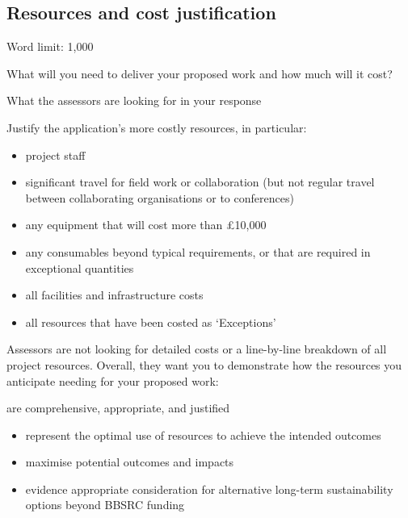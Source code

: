 \documentclass[12in]{article}
\begin{document}
\subsection{Resources and cost justification}

{\color{red}

Word limit: 1,000

What will you need to deliver your proposed work and how much will it cost?

What the assessors are looking for in your response

Justify the application’s more costly resources, in particular:

\begin{itemize}

	\item project staff

	\item significant travel for field work or collaboration (but not regular travel between collaborating organisations or to conferences)

	\item any equipment that will cost more than £10,000

	\item any consumables beyond typical requirements, or that are required in exceptional quantities

	\item all facilities and infrastructure costs

	\item all resources that have been costed as ‘Exceptions’

\end{itemize}

Assessors are not looking for detailed costs or a line-by-line breakdown of all project resources. Overall, they want you to demonstrate how the resources you anticipate needing for your proposed work:

are comprehensive, appropriate, and justified
\begin{itemize}

	\item represent the optimal use of resources to achieve the intended outcomes

	\item maximise potential outcomes and impacts

	\item evidence appropriate consideration for alternative long-term sustainability options beyond BBSRC funding

\end{itemize}

}
\end{document}
